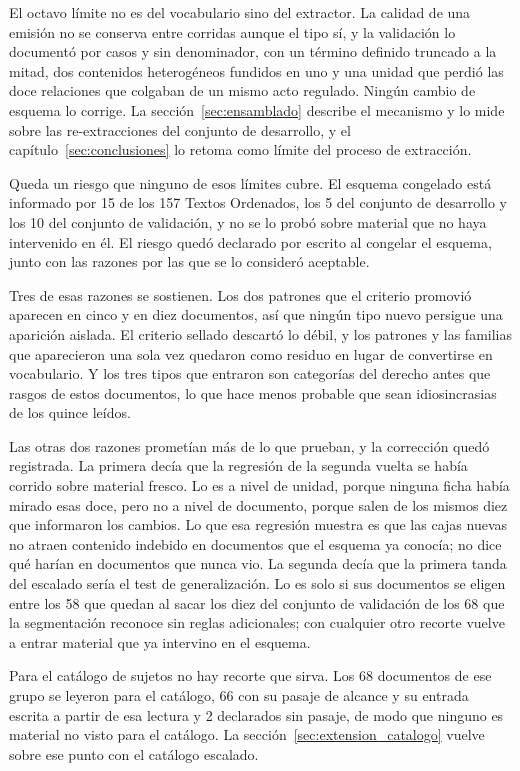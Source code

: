 \documentclass[12pt,a4paper]{report}
\begin{document}
El octavo límite no es del vocabulario sino del extractor. La calidad de una emisión no se conserva entre corridas aunque el tipo sí, y la validación lo documentó por casos y sin denominador, con un término definido truncado a la mitad, dos contenidos heterogéneos fundidos en uno y una unidad que perdió las doce relaciones que colgaban de un mismo acto regulado. Ningún cambio de esquema lo corrige. La sección~\ref{sec:ensamblado} describe el mecanismo y lo mide sobre las re-extracciones del conjunto de desarrollo, y el capítulo~\ref{sec:conclusiones} lo retoma como límite del proceso de extracción.

Queda un riesgo que ninguno de esos límites cubre. El esquema congelado está informado por 15 de los 157 Textos Ordenados, los 5 del conjunto de desarrollo y los 10 del conjunto de validación, y no se lo probó sobre material que no haya intervenido en él. El riesgo quedó declarado por escrito al congelar el esquema, junto con las razones por las que se lo consideró aceptable.

Tres de esas razones se sostienen. Los dos patrones que el criterio promovió aparecen en cinco y en diez documentos, así que ningún tipo nuevo persigue una aparición aislada. El criterio sellado descartó lo débil, y los patrones y las familias que aparecieron una sola vez quedaron como residuo en lugar de convertirse en vocabulario. Y los tres tipos que entraron son categorías del derecho antes que rasgos de estos documentos, lo que hace menos probable que sean idiosincrasias de los quince leídos.

Las otras dos razones prometían más de lo que prueban, y la corrección quedó registrada. La primera decía que la regresión de la segunda vuelta se había corrido sobre material fresco. Lo es a nivel de unidad, porque ninguna ficha había mirado esas doce, pero no a nivel de documento, porque salen de los mismos diez que informaron los cambios. Lo que esa regresión muestra es que las cajas nuevas no atraen contenido indebido en documentos que el esquema ya conocía; no dice qué harían en documentos que nunca vio. La segunda decía que la primera tanda del escalado sería el test de generalización. Lo es solo si sus documentos se eligen entre los 58 que quedan al sacar los diez del conjunto de validación de los 68 que la segmentación reconoce sin reglas adicionales; con cualquier otro recorte vuelve a entrar material que ya intervino en el esquema.

Para el catálogo de sujetos no hay recorte que sirva. Los 68 documentos de ese grupo se leyeron para el catálogo, 66 con su pasaje de alcance y su entrada escrita a partir de esa lectura y 2 declarados sin pasaje, de modo que ninguno es material no visto para el catálogo. La sección~\ref{sec:extension_catalogo} vuelve sobre ese punto con el catálogo escalado.
\end{document}
